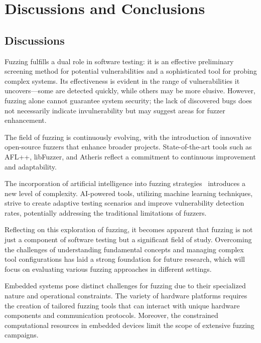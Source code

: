 \vspace{21.5pt}
\chapter{Discussions and Conclusions}
\section{Discussions}

Fuzzing fulfills a dual role in software testing: it is an effective
preliminary screening method for potential vulnerabilities and a sophisticated
tool for probing complex systems. Its effectiveness is evident in the range of
vulnerabilities it uncovers—some are detected quickly, while others may be more
elusive. However, fuzzing alone cannot guarantee system security; the lack of
discovered bugs does not necessarily indicate invulnerability but may suggest
areas for fuzzer enhancement.

The field of fuzzing is continuously evolving, with the introduction of
innovative open-source fuzzers that enhance broader projects. State-of-the-art
tools such as AFL++, libFuzzer, and Atheris reflect a commitment to continuous
improvement and adaptability.

The incorporation of artificial intelligence into fuzzing
strategies~\cite{GoogleOn27:online} introduces a new level of complexity.
AI-powered tools, utilizing machine learning techniques, strive to create
adaptive testing scenarios and improve vulnerability detection rates,
potentially addressing the traditional limitations of fuzzers.

Reflecting on this exploration of fuzzing, it becomes apparent that fuzzing is
not just a component of software testing but a significant field of study.
Overcoming the challenges of understanding fundamental concepts and managing
complex tool configurations has laid a strong foundation for future research,
which will focus on evaluating various fuzzing approaches in different settings.

Embedded systems pose distinct challenges for fuzzing due to their specialized
nature and operational constraints. The variety of hardware platforms requires
the creation of tailored fuzzing tools that can interact with unique hardware
components and communication protocols. Moreover, the constrained computational
resources in embedded devices limit the scope of extensive fuzzing campaigns.

